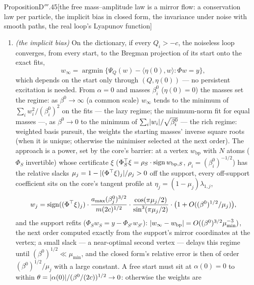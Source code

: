 \begin{thm}{Proposition}{D$'''$.45}[the free mass--amplitude law is a mirror flow: a conservation law per particle, the
implicit bias in closed form, the invariance under noise with smooth paths, the real loop's Lyapunov
function]
\begin{enumerate}[label=\textup{(\roman*)}]
    \begin{gather*}
      \psi = \lambda_1\abs w - (3/2)K\abs w^{2/3}(1 + o(1))\qquad((\beta^0)^{3/2}\ll\abs w\ll1),\\
      K = (a_{\max}^2/(2Gc))(2c/(a_{\max}^2m))^{1/3},
    \end{gather*}
    an $\ell^1$ norm of weight $\lambda_1$ with a concave correction that under-penalises small coefficients.
  \item \emph{(the implicit bias)} On the dictionary, if every $Q_i > -c$, the noiseless loop converges, from every
    start, to the Bregman projection of its start onto the exact fits,
    \[
      w_\infty = \operatorname{argmin}\{\Psi_Q(w) - \langle\eta(0),w\rangle : \Phi w = y\},
    \]
    which depends on the start only through $(Q,\eta(0))$ --- no persistent excitation is needed. From $\alpha = 0$ and
    masses $\beta^0_i$ ($\eta(0) = 0$) the masses set the regime: as $\beta^0\to\infty$ (a common scale) $w_\infty$ tends
    to the minimum of $\sum_iw_i^2/(\beta^0_i)^2$ on the fits --- the lazy regime; the minimum-norm fit for equal masses
    ---, as $\beta^0\to0$ to the minimum of $\sum_i\lvert w_i\rvert/\sqrt{\beta^0_i}$ --- the rich regime: weighted basis
    pursuit, the weights the starting masses' inverse square roots (when it is unique; otherwise the minimiser selected
    at the next order). The approach is a power, set by the core's barrier: at a vertex $w_{\mathrm{bp}}$ with $N$ atoms
    ($\Phi_S$ invertible) whose certificate $\xi$ ($\Phi_S^\top\xi = \rho_S\cdot\operatorname{sign}w_{\mathrm{bp},S}$,
    $\rho_i = (\beta^0_i)^{-1/2}$) has the relative slacks $\mu_j = 1 - \lvert (\Phi^\top\xi)_j\rvert/\rho_j > 0$ off the support,
    every off-support coefficient sits on the core's tangent profile at $\eta_j = (1 - \mu_j)\lambda_{1,j}$,
    \[
      w_j = \operatorname{sign}((\Phi^\top\xi)_j)\cdot\frac{a_{\max}(\beta^0_j)^{3/2}}{m(2c)^{1/2}}\cdot
      \frac{\cos(\pi\mu_j/2)}{\sin^3(\pi\mu_j/2)}\cdot\big(1 + O((\beta^0)^{1/2}/\mu_j)\big),
    \]
    and the support refits ($\Phi_Sw_S = y - \Phi_{S^c}w_{S^c}$):
    $\lvert w_\infty - w_{\mathrm{bp}}\rvert = O((\beta^0)^{3/2}\mu_{\min}^{-3})$, the next order computed exactly from the
    support's mirror coordinates at the vertex; a small slack --- a near-optimal second vertex --- delays this regime
    until $(\beta^0)^{1/2}\ll\mu_{\min}$, and the closed form's relative error is then of order
    $(\beta^0)^{1/2}/\mu_j$ with a large constant. A free start must sit at $\alpha(0) = 0$ to within
    $\theta = \lvert \alpha(0)\rvert/(\beta^0/(2c))^{1/2}\to0$: otherwise the weights are

\end{enumerate}
\end{thm}
